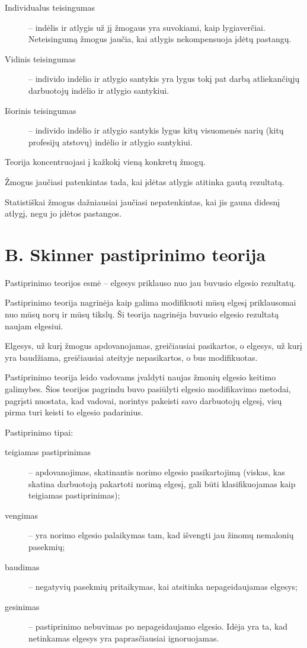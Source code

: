 \begin{description}
  \item[Individualus teisingumas] – indėlis ir atlygis už jį žmogaus
    yra suvokiami, kaip lygiaverčiai. Neteisingumą žmogus jaučia,
    kai atlygis nekompensuoja įdėtų pastangų.
  \item[Vidinis teisingumas] – individo indėlio ir atlygio santykis yra
    lygus tokį pat darbą atliekančiųjų darbuotojų indėlio ir atlygio
    santykiui.
  \item[Išorinis teisingumas] – individo indėlio ir atlygio santykis
    lygus kitų visuomenės narių (kitų profesijų atstovų) indėlio
    ir atlygio santykiui.
\end{description}

Teorija koncentruojasi į kažkokį vieną konkretų žmogų.

Žmogus jaučiasi patenkintas tada, kai įdėtas atlygis atitinka gautą
rezultatą.

Statistiškai žmogus dažniausiai jaučiasi nepatenkintas, kai jis gauna
didesnį atlygį, negu jo įdėtos pastangos.

\section{B. Skinner pastiprinimo teorija}

Pastiprinimo teorijos esmė – elgesys priklauso nuo jau buvusio elgesio
rezultatų.

Pastiprinimo teorija nagrinėja kaip galima modifikuoti mūsų elgesį
priklausomai nuo mūsų norų ir mūsų tikslų. Ši teorija nagrinėja
buvusio elgesio rezultatą naujam elgesiui.

Elgesys, už kurį žmogus apdovanojamas, greičiausiai pasikartos, o
elgesys, už kurį yra baudžiama, greičiausiai ateityje nepasikartos,
o bus modifikuotas.

Pastiprinimo teorija leido vadovams įvaldyti naujas žmonių elgesio
keitimo galimybes. Šios teorijos pagrindu buvo pasiūlyti elgesio
modifikavimo metodai, pagrįsti nuostata, kad vadovai, norintys
pakeisti savo darbuotojų elgesį, visų pirma turi keisti to elgesio
padarinius.

Pastiprinimo tipai:
\begin{description}
  \item[teigiamas pastiprinimas] – apdovanojimas, skatinantis norimo
    elgesio pasikartojimą (viskas, kas skatina darbuotoją pakartoti norimą
    elgesį, gali būti klasifikuojamas kaip teigiamas pastiprinimas);
  \item[vengimas] – yra norimo elgesio palaikymas tam, kad išvengti
    jau žinomų nemalonių pasekmių;
  \item[baudimas] – negatyvių pasekmių pritaikymas, kai atsitinka
    nepageidaujamas elgesys;
  \item[gesinimas] – pastiprinimo nebuvimas po nepageidaujamo elgesio.
    Idėja yra ta, kad netinkamas elgesys yra paprasčiausiai ignoruojamas.
\end{description}


